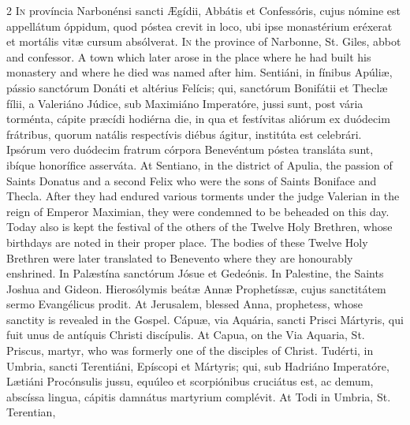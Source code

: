 \begin{paracol}{2}
\lettrine[lines=2]{I}{n} província Narbonénsi 
 sancti Ægídii, Abbátis et Confessóris, cujus nómine est appellátum óppidum, 
 quod póstea crevit in loco, ubi ipse monastérium eréxerat et mortális vitæ 
 cursum absólverat.
\switchcolumn
{}
\lettrine[lines=2]{I}{n} the province of Narbonne, St. 
 Giles, abbot and confessor. A town which later arose in the place 
 where he had built his monastery and where he died was named after him.
\switchcolumn*
{}
Sentiáni, in fínibus 
 Apúliæ, pássio sanctórum Donáti et altérius Felícis; qui, sanctórum 
 Bonifátii et Theclæ fílii, a Valeriáno Júdice, sub Maximiáno Imperatóre, 
 jussi sunt, post vária torménta, cápite præcídi hodiérna die, in qua et 
 festívitas aliórum ex duódecim frátribus, quorum natális respectívis diébus 
 ágitur, institúta est celebrári. Ipsórum vero duódecim fratrum córpora 
 Benevéntum póstea transláta sunt, ibíque honorífice asserváta.
\switchcolumn
{}
At Sentiano, in the district of 
 Apulia, the passion of Saints Donatus and a second Felix who were the sons 
 of Saints Boniface and Thecla. After they had endured various torments 
 under the judge Valerian in the reign of Emperor Maximian, they were 
 condemned to be beheaded on this day. Today also is kept the festival 
 of the others of the Twelve Holy Brethren, whose birthdays are noted in 
 their proper place. The bodies of these Twelve Holy Brethren were 
 later translated to Benevento where they are honourably enshrined.
\switchcolumn*
{}
In Palæstína sanctórum 
 Jósue et Gedeónis.
\switchcolumn
{}
In Palestine, the Saints Joshua and 
 Gideon.
\switchcolumn*
{}
Hierosólymis beátæ Annæ 
 Prophetíssæ, cujus sanctitátem sermo Evangélicus prodit.
\switchcolumn
{}
At Jerusalem, blessed Anna, 
 prophetess, whose sanctity is revealed in the Gospel.
\switchcolumn*
{}
Cápuæ, via Aquária, 
 sancti Prisci Mártyris, qui fuit unus de antíquis Christi discípulis.
\switchcolumn
{}
At Capua, on the Via Aquaria, St. 
 Priscus, martyr, who was formerly one of the disciples of Christ.
\switchcolumn*
{}
Tudérti, in Umbria, 
 sancti Terentiáni, Epíscopi et Mártyris; qui, sub Hadriáno Imperatóre, 
 Lætiáni Procónsulis jussu, equúleo et scorpiónibus cruciátus est, ac demum, 
 abscíssa lingua, cápitis damnátus martyrium complévit.
\switchcolumn
{}
At Todi in Umbria, St. Terentian, 

\end{paracol}

